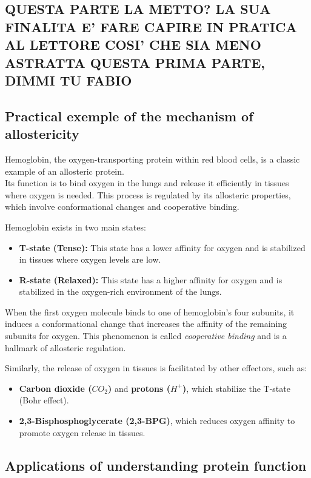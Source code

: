 \documentclass[English, Lau, oneside]{sapthesis}
\begin{document}
\subsection{QUESTA PARTE LA METTO? LA SUA FINALITA E' FARE CAPIRE IN PRATICA AL LETTORE COSI' CHE SIA MENO ASTRATTA QUESTA PRIMA PARTE, DIMMI TU FABIO}
\subsection{Practical exemple of the mechanism of allostericity}
\noindent Hemoglobin, the oxygen-transporting protein within red blood cells, is a classic example of an allosteric protein.  \\
Its function is to bind oxygen in the lungs and release it efficiently in tissues where oxygen is needed. This process is regulated by its allosteric properties, which involve conformational changes and cooperative binding.

Hemoglobin exists in two main states:\cite{ref7}
\begin{itemize}
    \item \textbf{T-state (Tense):} This state has a lower affinity for oxygen and is stabilized in tissues where oxygen levels are low.
    \item \textbf{R-state (Relaxed):} This state has a higher affinity for oxygen and is stabilized in the oxygen-rich environment of the lungs.
\end{itemize}

When the first oxygen molecule binds to one of hemoglobin's four subunits, it induces a conformational change that increases the affinity of the remaining subunits for oxygen. 
This phenomenon is called \textit{cooperative binding} and is a hallmark of allosteric regulation.

Similarly, the release of oxygen in tissues is facilitated by other effectors, such as:
\begin{itemize}
    \item \textbf{Carbon dioxide (\(CO_2\))} and \textbf{protons (\(H^+\))}, which stabilize the T-state (Bohr effect).
    \item \textbf{2,3-Bisphosphoglycerate (2,3-BPG)}, which reduces oxygen affinity to promote oxygen release in tissues.
\end{itemize}

\subsection{Applications of understanding protein function}
\end{document}
